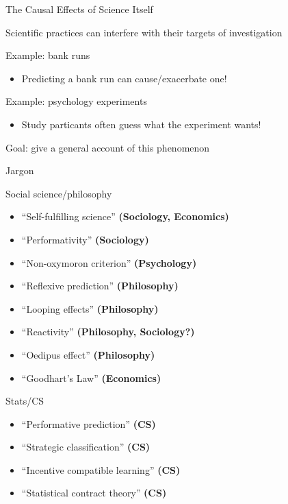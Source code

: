 \documentclass[aspectratio=169,xcolor=dvipsnames]{beamer}
\begin{document}
\begin{frame}{The Causal Effects of Science Itself}

Scientific practices can interfere with their targets of investigation

\vspace{5mm}
Example: bank runs
\begin{itemize}
    \item Predicting a bank run can cause/exacerbate one!
\end{itemize}

\vspace{5mm}
Example: psychology experiments
\begin{itemize}
    \item Study particants often guess what the experiment wants!
\end{itemize}

\vspace{5mm}
{\color{red}Goal: give a general account of this phenomenon}

\end{frame}


\begin{frame}{Jargon}

Social science/philosophy
\begin{itemize}
    \item ``Self-fulfilling science'' \autocite{merton1948} \textbf{(Sociology, Economics)}
    \item ``Performativity'' \autocite{healy2015} \textbf{(Sociology)}
    \item ``Non-oxymoron criterion'' \autocite{luce95} \textbf{(Psychology)}
    \item ``Reflexive prediction'' \autocite{buck1963} \textbf{(Philosophy)}
    \item ``Looping effects'' \autocite{hacking1983} \textbf{(Philosophy)}
    \item ``Reactivity'' \autocite{runhardt2023} \textbf{(Philosophy, Sociology?)}
    \item ``Oedipus effect'' \autocite{popper1953} \textbf{(Philosophy)}
    \item ``Goodhart's Law'' \autocite{goodhart1984} \textbf{(Economics)}
\end{itemize}

\vspace{5mm}
Stats/CS
\begin{itemize}
    \item ``Performative prediction'' \autocite{perdomo2020} \textbf{(CS)}
    \item ``Strategic classification'' \autocite{hardt2016} \textbf{(CS)}
    \item ``Incentive compatible learning'' \autocite{dekel2010} \textbf{(CS)}
    \item ``Statistical contract theory'' \autocite{bates2022} \textbf{(CS)}
\end{itemize}

\end{frame}
\end{document}
